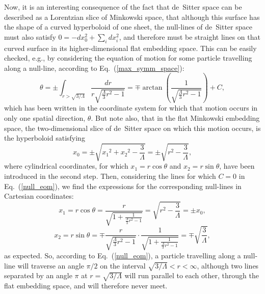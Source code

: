 Now, it is an interesting consequence of the fact that de~Sitter space can be described as a Lorentzian slice of Minkowski space, that although this surface has the shape of a curved hyperboloid of one sheet, the null-lines of de~Sitter space must also satisfy $0=-dx_0^2+\sum_{i}dx_i^2$, and therefore must be straight lines on that curved surface in its higher-dimensional flat embedding space. This can be easily checked, e.g., by considering the equation of motion for some particle travelling along a null-line, according to Eq.~(\ref{max_symm_space}):
\begin{equation}
\theta=\pm\int_{r>\sqrt{3/\Lambda}}\frac{dr}{r\sqrt{\frac{\Lambda}{3}r^2-1}}=\mp\arctan\left(\frac{1}{\sqrt{\frac{\Lambda}{3}r^2-1}}\right)+C,\label{null_eom}
\end{equation}
which has been written in the coordinate system for which that motion occurs in only one spatial direction, $\theta$. But note also, that in the flat Minkowski embedding space, the two-dimensional slice of de~Sitter space on which this motion occurs, is the hyperboloid satisfying
\begin{equation}
{x_0}=\pm\sqrt{{x_1}^2+{x_2}^2-\frac{3}{\Lambda}}=\pm\sqrt{r^2-\frac{3}{\Lambda}},
\end{equation}
where cylindrical coordinates, for which $x_1=r\cos\theta$ and $x_2=r\sin\theta$, have been introduced in the second step. Then, considering the lines for which $C=0$ in Eq.~(\ref{null_eom}), we find the expressions for the corresponding null-lines in Cartesian coordinates:
\begin{equation}
x_1=r\cos\theta=\frac{r}{\sqrt{1+\frac{1}{\frac{\Lambda}{3}r^2-1}}}=\sqrt{r^2-\frac{3}{\Lambda}}=\pm{x_0},
\end{equation}
\begin{equation}
x_2=r\sin\theta=\mp\frac{r}{\sqrt{\frac{\Lambda}{3}r^2-1}}\cdot\frac{1}{\sqrt{1+\frac{1}{\frac{\Lambda}{3}r^2-1}}}=\mp\sqrt{\frac{3}{\Lambda}},
\end{equation}
as expected. So, according to Eq.~(\ref{null_eom}), a particle travelling along a null-line will traverse an angle $\pi/2$ on the interval $\sqrt{3/\Lambda}<r<\infty$, although two lines separated by an angle $\pi$ at $r=\sqrt{3/\Lambda}$ will run parallel to each other, through the flat embedding space, and will therefore never meet.

